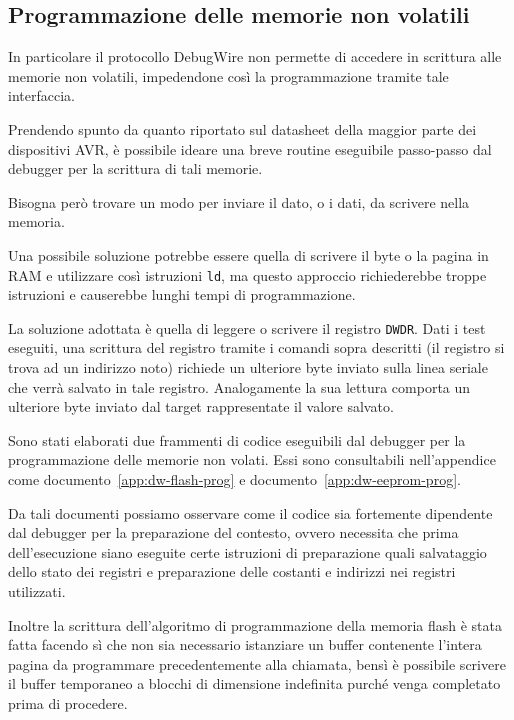 \subsection{Programmazione delle memorie non volatili}

In particolare il protocollo DebugWire non permette di accedere in scrittura alle memorie non volatili, impedendone così la programmazione tramite tale interfaccia.

Prendendo spunto da quanto riportato sul datasheet della maggior parte dei dispositivi AVR\cite[34]{avr:m328p}\cite[sec 26.2.5]{avr:m328p}, è possibile ideare una breve routine eseguibile passo-passo dal debugger per la scrittura di tali memorie.

Bisogna però trovare un modo per inviare il dato, o i dati, da scrivere nella memoria.

Una possibile soluzione potrebbe essere quella di scrivere il byte o la pagina in RAM e utilizzare così istruzioni \texttt{ld}, ma questo approccio richiederebbe troppe istruzioni e causerebbe lunghi tempi di programmazione.

La soluzione adottata è quella di leggere o scrivere il registro \texttt{DWDR}. Dati i test eseguiti, una scrittura del registro tramite i comandi sopra descritti (il registro si trova ad un indirizzo noto) richiede un ulteriore byte inviato sulla linea seriale che verrà salvato in tale registro\cite{site:dw-reverse-engeneering}. Analogamente la sua lettura comporta un ulteriore byte inviato dal target rappresentate il valore salvato\cite{site:dw-reverse-engeneering}.

Sono stati elaborati due frammenti di codice eseguibili dal debugger per la programmazione delle memorie non volati. Essi sono consultabili nell'appendice come documento~\ref{app:dw-flash-prog} e documento~\ref{app:dw-eeprom-prog}.

Da tali documenti possiamo osservare come il codice sia fortemente dipendente dal debugger per la preparazione del contesto, ovvero necessita che prima dell'esecuzione siano eseguite certe istruzioni di preparazione quali salvataggio dello stato dei registri e preparazione delle costanti e indirizzi nei registri utilizzati.

Inoltre la scrittura dell'algoritmo di programmazione della memoria flash è stata fatta facendo sì che non sia necessario istanziare un buffer contenente l'intera pagina da programmare precedentemente alla chiamata, bensì è possibile scrivere il buffer temporaneo a blocchi di dimensione indefinita purché venga completato prima di procedere.


